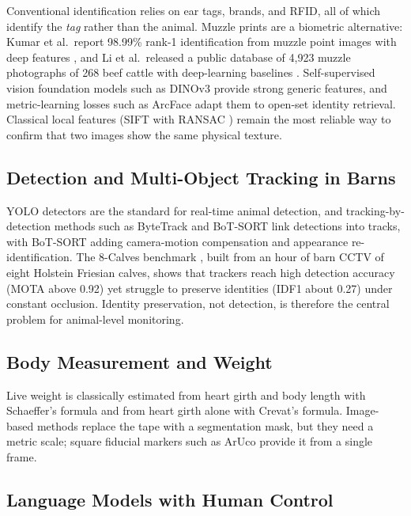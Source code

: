 \documentclass[11pt,letterpaper]{article}
\begin{document}
Conventional identification relies on ear tags, brands, and RFID, all of which identify the \emph{tag} rather than the animal. Muzzle prints are a biometric alternative: Kumar et al.\ report 98.99\% rank-1 identification from muzzle point images with deep features \cite{kumar2017muzzle}, and Li et al.\ released a public database of 4{,}923 muzzle photographs of 268 beef cattle with deep-learning baselines \cite{li2022muzzle}. Self-supervised vision foundation models such as DINOv3 \cite{simeoni2025dinov3} provide strong generic features, and metric-learning losses such as ArcFace \cite{deng2019arcface} adapt them to open-set identity retrieval. Classical local features (SIFT \cite{lowe2004sift} with RANSAC \cite{fischler1981ransac}) remain the most reliable way to confirm that two images show the same physical texture.

\subsection{Detection and Multi-Object Tracking in Barns}

YOLO detectors \cite{jocher2023yolov8} are the standard for real-time animal detection, and tracking-by-detection methods such as ByteTrack \cite{zhang2022bytetrack} and BoT-SORT \cite{aharon2022botsort} link detections into tracks, with BoT-SORT adding camera-motion compensation and appearance re-identification. The 8-Calves benchmark \cite{fang2025eightcalves}, built from an hour of barn CCTV of eight Holstein Friesian calves, shows that trackers reach high detection accuracy (MOTA above 0.92) yet struggle to preserve identities (IDF1 about 0.27) under constant occlusion. Identity preservation, not detection, is therefore the central problem for animal-level monitoring.

\subsection{Body Measurement and Weight}

Live weight is classically estimated from heart girth and body length with Schaeffer's formula and from heart girth alone with Crevat's formula. Image-based methods replace the tape with a segmentation mask, but they need a metric scale; square fiducial markers such as ArUco \cite{garrido2014aruco} provide it from a single frame.

\subsection{Language Models with Human Control}
\end{document}
